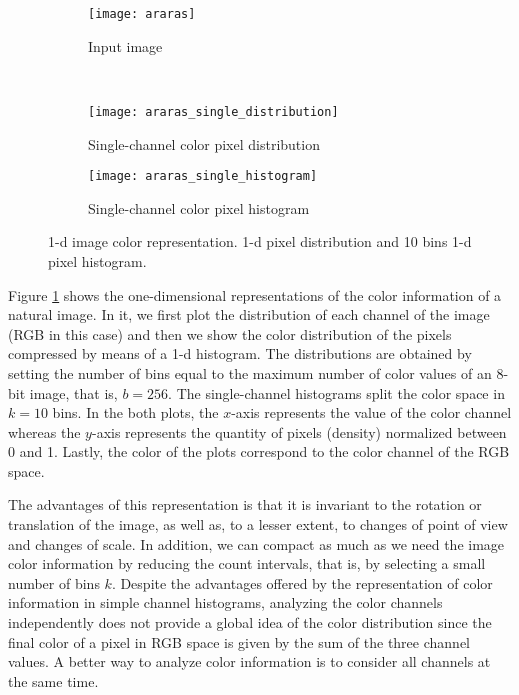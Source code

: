 \begin{figure}[!ht]

	\centering
    \begin{subfigure}[b]{0.25\textwidth}
        \texttt{[image: araras]}
        \caption{Input image}
    \end{subfigure} \\
       
    \begin{subfigure}[b]{0.49\textwidth}
        \texttt{[image: araras\_single\_distribution]}
        \caption{Single-channel color pixel distribution}
    \end{subfigure} 
    \begin{subfigure}[b]{0.49\textwidth}
        \texttt{[image: araras\_single\_histogram]}
        \caption{Single-channel color pixel histogram}
    \end{subfigure}    
    
    \caption{1-d image color representation. 1-d pixel distribution and 10 bins 1-d pixel histogram.}\label{fig:single_channel_histogram}    
\end{figure}

Figure \ref{fig:single_channel_histogram} shows the one-dimensional representations of the color information of a natural image. In it, we first plot the distribution of each channel of the image (RGB in this case) and then we show the color distribution of the pixels compressed by means of a 1-d histogram. The distributions are obtained by setting the number of bins equal to the maximum number of color values of an 8-bit image, that is, $b = 256$. The single-channel histograms split the color space in $k=10$ bins. In the both plots, the $x$-axis represents the value of the color channel whereas the $y$-axis represents the quantity of pixels (density) normalized between 0 and 1. Lastly, the color of the plots correspond to the color channel of the RGB space.

The advantages of this representation is that it is invariant to the rotation or translation of the image, as well as, to a lesser extent, to changes of point of view and changes of scale. In addition, we can compact as much as we need the image color information by reducing the count intervals, that is, by selecting a small number of bins $k$. Despite the advantages offered by the representation of color information in simple channel histograms, analyzing the color channels independently does not provide a global idea of the color distribution since the final color of a pixel in RGB space is given by the sum of the three channel values.  A better way to analyze color information is to consider all channels at the same time.

